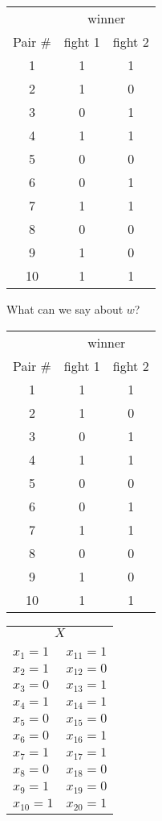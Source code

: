 \documentclass[landscape]{foils}
\begin{document}
\myNewSlide
\begin{center}
\begin{tabular}{|c|c|c|}
\hline
& \multicolumn{2}{c|}{winner}\\
Pair \# & fight 1 & fight 2 \\
\hline
1 & 1 & 1  \\
\hline
2 & 1 & 0  \\
\hline
3 & 0 & 1  \\
\hline
4 & 1 & 1  \\
\hline
5 & 0 & 0  \\
\hline
6 & 0 & 1   \\
\hline
7 & 1 & 1  \\
\hline
8 & 0 & 0  \\
\hline
9 & 1 & 0  \\
\hline
10 & 1 & 1   \\
\hline
\end{tabular}
\end{center}

What can we say about $w$?


\myNewSlide
\begin{center}
\begin{tabular}{|c|c|c|}
\hline
& \multicolumn{2}{c|}{winner}\\
Pair \# & fight 1 & fight 2 \\
\hline
1 & 1 & 1  \\
\hline
2 & 1 & 0  \\
\hline
3 & 0 & 1  \\
\hline
4 & 1 & 1  \\
\hline
5 & 0 & 0  \\
\hline
6 & 0 & 1   \\
\hline
7 & 1 & 1  \\
\hline
8 & 0 & 0  \\
\hline
9 & 1 & 0  \\
\hline
10 & 1 & 1   \\
\hline
\end{tabular}
\begin{tabular}{ll}
\multicolumn{2}{c}{$X$}\\
\\
$x_1 = 1$ & $x_{11} = 1$  \\
$x_2 = 1$ & $x_{12} = 0$  \\
$x_3 = 0$ & $x_{13} = 1$  \\
$x_4 = 1$ & $x_{14} = 1$  \\
$x_5 = 0$ & $x_{15} = 0$  \\
$x_6 = 0$ & $x_{16} = 1$  \\
$x_7 = 1$ & $x_{17} = 1$  \\
$x_8 = 0$ & $x_{18} = 0$  \\
$x_9 = 1$ & $x_{19} = 0$  \\
$x_{10} = 1$ & $x_{20} = 1$  \\
\end{tabular}
\end{center}
\end{document}
